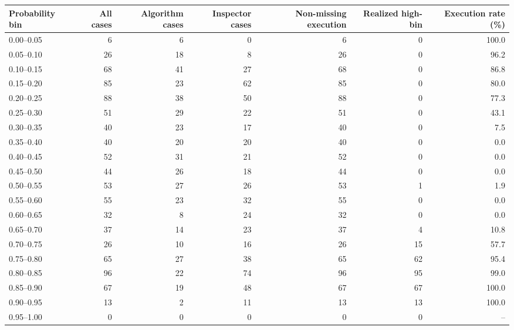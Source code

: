 \begin{tabular}[t]{lrrrrrr}
\toprule
Probability bin & All cases & Algorithm cases & Inspector cases & Non-missing execution & Realized high-bin & Execution rate (\%)\\
\midrule
0.00--0.05 & 6 & 6 & 0 & 6 & 0 & 100.0\\
0.05--0.10 & 26 & 18 & 8 & 26 & 0 & 96.2\\
0.10--0.15 & 68 & 41 & 27 & 68 & 0 & 86.8\\
0.15--0.20 & 85 & 23 & 62 & 85 & 0 & 80.0\\
0.20--0.25 & 88 & 38 & 50 & 88 & 0 & 77.3\\
0.25--0.30 & 51 & 29 & 22 & 51 & 0 & 43.1\\
0.30--0.35 & 40 & 23 & 17 & 40 & 0 & 7.5\\
0.35--0.40 & 40 & 20 & 20 & 40 & 0 & 0.0\\
0.40--0.45 & 52 & 31 & 21 & 52 & 0 & 0.0\\
0.45--0.50 & 44 & 26 & 18 & 44 & 0 & 0.0\\
0.50--0.55 & 53 & 27 & 26 & 53 & 1 & 1.9\\
0.55--0.60 & 55 & 23 & 32 & 55 & 0 & 0.0\\
0.60--0.65 & 32 & 8 & 24 & 32 & 0 & 0.0\\
0.65--0.70 & 37 & 14 & 23 & 37 & 4 & 10.8\\
0.70--0.75 & 26 & 10 & 16 & 26 & 15 & 57.7\\
0.75--0.80 & 65 & 27 & 38 & 65 & 62 & 95.4\\
0.80--0.85 & 96 & 22 & 74 & 96 & 95 & 99.0\\
0.85--0.90 & 67 & 19 & 48 & 67 & 67 & 100.0\\
0.90--0.95 & 13 & 2 & 11 & 13 & 13 & 100.0\\
0.95--1.00 & 0 & 0 & 0 & 0 & 0 & --\\
\bottomrule
\end{tabular}
